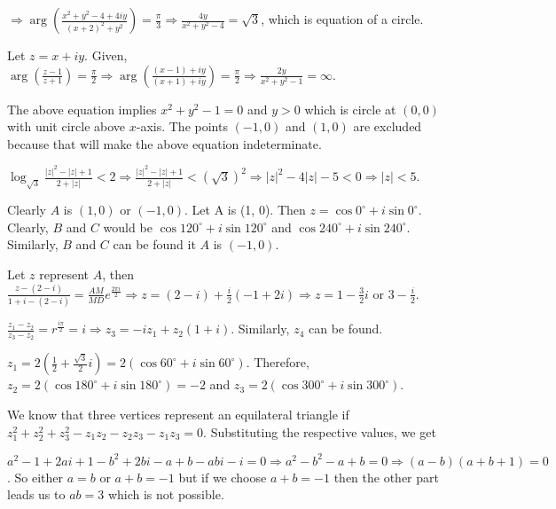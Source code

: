   $\Rightarrow \arg\left(\frac{x^2 + y^2 - 4 + 4iy}{(x + 2)^2 + y^2}\right) = \frac{\pi}{3}\Rightarrow
  \frac{4y}{x^2 + y^2 - 4} = \sqrt{3}$, which is equation of a circle.
\item Let $z = x + iy$. Given, $\arg\left(\frac{z - 1}{z + 1}\right) = \frac{\pi}{2} \Rightarrow
  \arg\left(\frac{(x - 1) + iy}{(x + 1) + iy}\right) = \frac{\pi}{2} \Rightarrow \frac{2y}{x^2 + y^2 - 1} =
  \infty$.

  The above equation implies $x^2 + y^2 - 1 = 0$ and $y > 0$ which is circle at $(0, 0)$ with unit circle
  above $x$-axis. The points $(-1, 0)$ and $(1, 0)$ are excluded because that will make the above equation
  indeterminate.
\item $\log_{\sqrt{3}}\frac{|z|^2 - |z| + 1}{2 + |z|} < 2\Rightarrow \frac{|z|^2 - |z| + 1}{2 + |z|} <
  (\sqrt{3})^2\Rightarrow |z|^2 - 4|z| - 5 < 0\Rightarrow |z| < 5$.
\item Clearly $A$ is $(1, 0)$ or $(-1, 0)$. Let A is (1, 0). Then $z = \cos0^\circ + i\sin0^\circ.$ Clearly,
  $B$ and $C$ would be $\cos120^\circ + i\sin120^\circ$ and $\cos240^\circ + i\sin240^\circ$. Similarly, $B$
  and $C$ can be found it $A$ is $(-1, 0)$.
\item Let $z$ represent $A$, then $\frac{z - (2 - i)}{1 + i - (2 - i)} = \frac{AM}{MD}e^{\frac{2\pi i}{2}}
  \Rightarrow z = (2 - i) + \frac{i}{2}(-1 + 2i) \Rightarrow z = 1 - \frac{3}{2}i$ or $3 -\frac{i}{2}$.
\item $\frac{z_1 - z_2}{z_3 - z_2} = r^{\frac{i\pi}{2}} = i\Rightarrow z_3 = -iz_1 + z_2(1 + i)$. Similarly,
  $z_4$ can be found.
\item $z_1 =2\left(\frac{1}{2} + \frac{\sqrt{3}}{2}i\right) = 2(\cos60^\circ + i\sin60^\circ)$. Therefore,
  $z_2 = 2(\cos180^\circ + i\sin180^\circ) = -2$ and $z_3 = 2(\cos300^\circ + i\sin300^\circ)$.
\item We know that three vertices represent an equilateral triangle if $z_1^2 + z_2^2 + z_3^2 - z_1z_2 -
  z_2z_3 -z_1z_3 = 0.$ Substituting the respective values, we get

  $a^2 - 1 + 2ai + 1 - b^2 + 2bi - a + b - abi - i = 0 \Rightarrow a^2 - b^2 - a + b = 0 \Rightarrow (a -
  b)(a + b + 1) = 0$. So either $a = b$ or $a + b = -1$ but if we choose $a + b = -1$ then the other part
  leads us to $ab = 3$ which is not possible.

